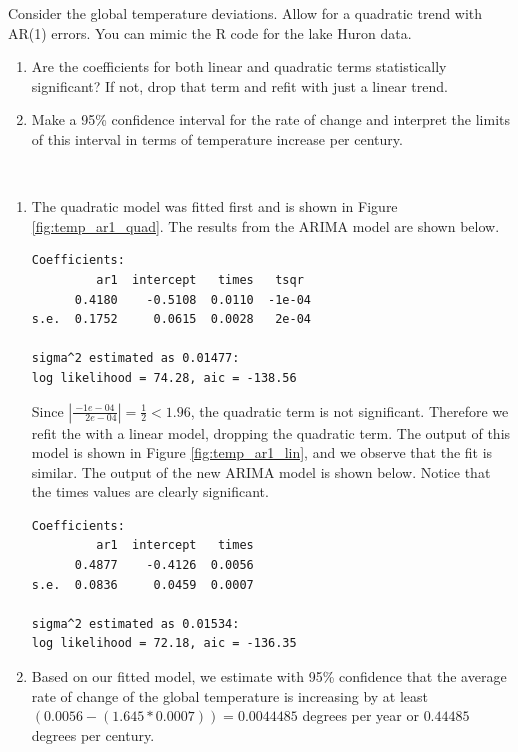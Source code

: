 \documentclass[12pt]{article}
\newenvironment{solution}[2][Solution]{\begin{trivlist}
\item[\hskip \labelsep {\bfseries #1}]}{\end{trivlist}}
\newenvironment{problem}[2][Problem]{\begin{trivlist}
\item[\hskip \labelsep {\bfseries #1}\hskip \labelsep {\bfseries #2.}]}{\end{trivlist}}
\begin{document}
\begin{problem}{8}
Consider the global temperature deviations. Allow for a quadratic trend with AR(1) errors. You can mimic the R code for the lake Huron data. \begin{enumerate}[label=(\alph*)]
    \item Are the coefficients for both linear and quadratic terms statistically significant?  If not, drop that term and refit with just a linear trend.
    \item Make a 95\% confidence interval for the rate of change and interpret the limits of this interval in terms of temperature increase per century.  
\end{enumerate}
\end{problem}

\begin{solution}{}
$ $
\begin{enumerate}[label=(\alph*)]
    \item The quadratic model was fitted first and is shown in Figure \ref{fig:temp_ar1_quad}. The results from the ARIMA model are shown below.
    \begin{lstlisting}
Coefficients:
         ar1  intercept   times   tsqr
      0.4180    -0.5108  0.0110  -1e-04
s.e.  0.1752     0.0615  0.0028   2e-04

sigma^2 estimated as 0.01477: 
log likelihood = 74.28, aic = -138.56
    \end{lstlisting} 
    Since $|{\frac{-1e-04}{\phantom{-}2e-04}}| = \frac{1}{2} < 1.96$, the quadratic term is not significant. Therefore we refit the with a linear model, dropping the quadratic term. The output of this model is shown in Figure \ref{fig:temp_ar1_lin}, and we observe that the fit is similar. The output of the new ARIMA model is shown below. Notice that the times values are clearly significant. 
    \begin{lstlisting}
Coefficients:
         ar1  intercept   times
      0.4877    -0.4126  0.0056
s.e.  0.0836     0.0459  0.0007

sigma^2 estimated as 0.01534: 
log likelihood = 72.18, aic = -136.35
    \end{lstlisting}
    \item Based on our fitted model, we estimate with 95\% confidence that the average rate of change of the global temperature is increasing by at least $(0.0056-(1.645*0.0007)) = 0.0044485$ degrees per year or $0.44485$ degrees per century. 
\end{enumerate}


\end{solution}
\end{document}
